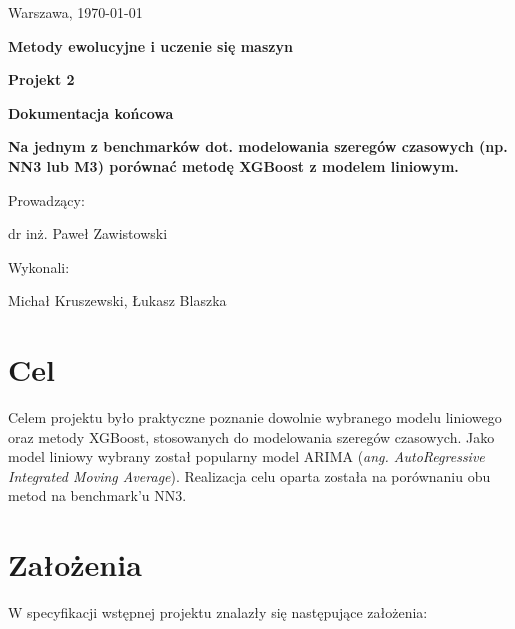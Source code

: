 \documentclass[11pt]{report}
\begin{document}
\thispagestyle{empty}

\begin{flushright}
\large{Warszawa, \today}
\end{flushright}

\vspace{5 cm}

\begin{center}
\LARGE{\textbf{Metody ewolucyjne i uczenie się maszyn}}

\vspace{5 mm}

\Large{\textbf{Projekt 2}}

\Large{\textbf{Dokumentacja końcowa}}

\vspace{5 mm}

\Large{\textbf{Na jednym z benchmarków dot. modelowania szeregów czasowych (np. NN3 lub M3) porównać metodę XGBoost z modelem liniowym.}}
\end{center}

\vspace{3 cm}

\begin{flushright}
\large{Prowadzący:}

\large{dr inż. Paweł Zawistowski}
\end{flushright}

\vspace{1 cm}

\begin{flushright}
\large{Wykonali:}

\large{Michał Kruszewski, Łukasz Blaszka}
\end{flushright}

\newpage

\tableofcontents
\newpage

\section{Cel}
Celem projektu było praktyczne poznanie dowolnie wybranego modelu liniowego oraz metody XGBoost, stosowanych do modelowania szeregów czasowych.
Jako model liniowy wybrany został popularny model ARIMA (\textit{ang. AutoRegressive Integrated Moving Average}).
Realizacja celu oparta została na porównaniu obu metod na benchmark'u NN3.

\section{Założenia}
W specyfikacji wstępnej projektu znalazły się następujące założenia:
\end{document}
